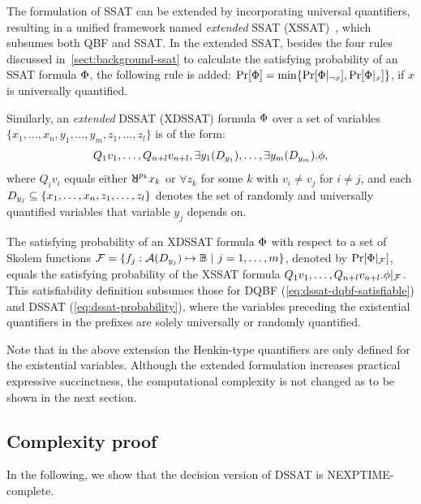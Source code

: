 The formulation of SSAT can be extended by incorporating universal quantifiers,
resulting in a unified framework named \textit{extended} SSAT (XSSAT)~\cite{SATHandbook-SSAT},
which subsumes both QBF and SSAT.
In the extended SSAT,
besides the four rules discussed in~\cref{sect:background-ssat} to calculate the satisfying probability of an SSAT formula $\Phi$,
the following rule is added:
$\Pr[\Phi]=\min\{\Pr[\Phi|_{\lnot x}],\Pr[\Phi|_{x}]\}$, if $x$ is universally quantified.

Similarly, an \textit{extended} DSSAT (XDSSAT) formula $\Phi$ over a set of variables
$\{x_1,\ldots,x_n,y_1,\ldots,y_m,z_1,\ldots,z_l\}$ is of the form:
\begin{align}\label{eq:dssat-xdssat}
    Q_1 v_1,\ldots,Q_{n+l} v_{n+l},\exists y_1(D_{y_1}),\ldots,\exists y_m(D_{y_m}).\phi,
\end{align}
where $Q_i v_i$ equals either $\random{p_k} x_k$ or $\forall z_k$ for some $k$ with $v_i \neq v_j$ for $i \neq j$,
and each $D_{y_j}\subseteq\{x_1,\ldots,x_n,z_1,\ldots,z_l\}$ denotes the set of randomly and universally quantified variables that variable $y_j$ depends on.

The satisfying probability of an XDSSAT formula $\Phi$ with respect to a set of Skolem functions
$\skf=\{f_j:\av{\dep{y_j}}\mapsto\booldom\ |\ j=1,\ldots,m\}$,
denoted by $\Pr[\Phi|_{\mathcal{F}}]$,
equals the satisfying probability of the XSSAT formula $Q_1 v_1,\ldots,Q_{n+l} v_{n+l}.\phi|_{\mathcal{F}}$.
This satisfiability definition subsumes those for DQBF (\cref{eq:dssat-dqbf-satisfiable}) and DSSAT (\cref{eq:dssat-probability}),
where the variables preceding the existential quantifiers in the prefixes are solely universally or randomly quantified.

Note that in the above extension the Henkin-type quantifiers are only defined for the existential variables.
Although the extended formulation increases practical expressive succinctness,
the computational complexity is not changed as to be shown in the next section.

\subsection{Complexity proof}
In the following, we show that the decision version of DSSAT is NEXPTIME-complete.

